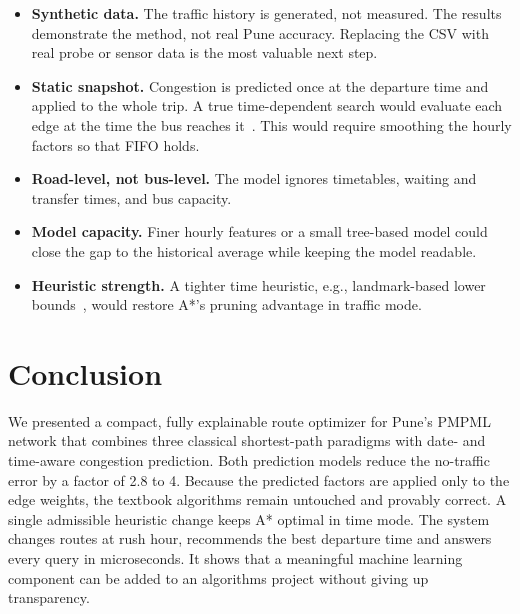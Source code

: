 \documentclass[conference]{IEEEtran}
\begin{document}
\begin{itemize}
  \item \textbf{Synthetic data.} The traffic history is generated, not
        measured. The results demonstrate the method, not real Pune
        accuracy. Replacing the CSV with real probe or sensor data is
        the most valuable next step.
  \item \textbf{Static snapshot.} Congestion is predicted once at the
        departure time and applied to the whole trip. A true
        time-dependent search would evaluate each edge at the time the
        bus reaches it~\cite{cooke1966,kaufman1993}. This would require
        smoothing the hourly factors so that FIFO holds.
  \item \textbf{Road-level, not bus-level.} The model ignores
        timetables, waiting and transfer times, and bus capacity.
  \item \textbf{Model capacity.} Finer hourly features or a small
        tree-based model could close the gap to the historical average
        while keeping the model readable.
  \item \textbf{Heuristic strength.} A tighter time heuristic, e.g.,
        landmark-based lower bounds~\cite{delling2009}, would restore
        A*'s pruning advantage in traffic mode.
\end{itemize}

\section{Conclusion}\label{sec:conclusion}

We presented a compact, fully explainable route optimizer for Pune's
PMPML network that combines three classical shortest-path paradigms
with date- and time-aware congestion prediction. Both prediction models
reduce the no-traffic error by a factor of 2.8 to 4. Because the
predicted factors are applied only to the edge weights, the textbook
algorithms remain untouched and provably correct. A single admissible
heuristic change keeps A* optimal in time mode. The system changes
routes at rush hour, recommends the best departure time and answers
every query in microseconds. It shows that a meaningful machine learning
component can be added to an algorithms project without giving up
transparency.
\end{document}
